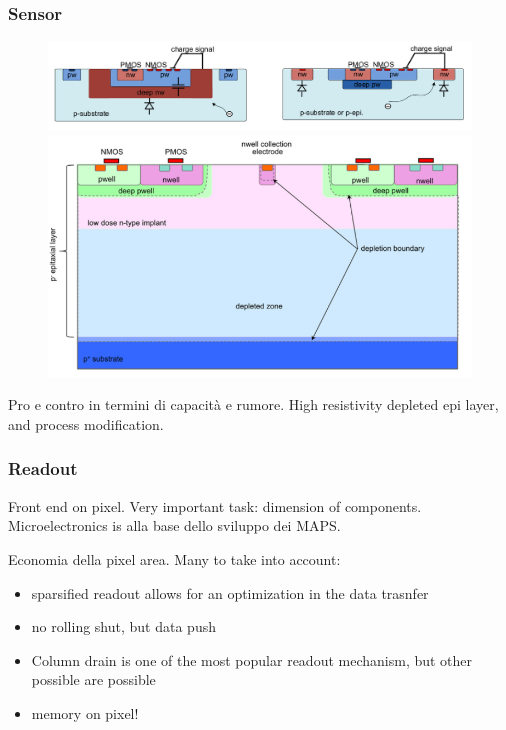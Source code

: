     \begin{frame}
        \frametitle{Sensor}
        \begin{figure}[h!]
            \centering
            \includegraphics[width=.8\linewidth]{figures/Pixel_detectors/large_small_sensor_scheme.png}\\
            \includegraphics[width=.8\linewidth]{figures/Pixel_detectors/ALPIDE_after_PM.png}
        \end{figure}
        Pro e contro in termini di capacità e rumore. 
        High resistivity depleted epi layer, and process modification. 
    \end{frame} 

    \begin{frame}
        \frametitle{Readout}
        Front end on pixel. Very important task: dimension of components. 
        Microelectronics is alla base dello sviluppo dei MAPS. 
        
        Economia della pixel area. Many to take into account:
        \begin{itemize}
            \item sparsified readout allows for an optimization in the data trasnfer
            \item no rolling shut, but data push
            \item Column drain is one of the most popular readout mechanism, but other possible are possible
            \item memory on pixel!
        \end{itemize}
 
    \end{frame} 